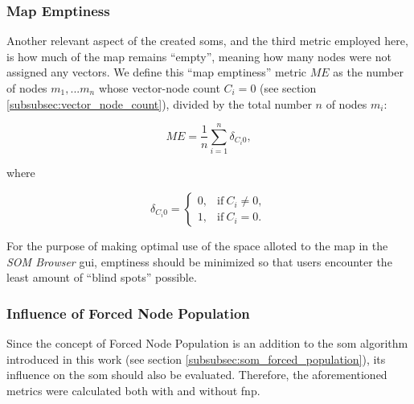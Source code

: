 \subsubsection{Map Emptiness}
\label{subsubsec:map_emptiness}
Another relevant aspect of the created \glspl{som}, and the third metric
employed here, is how much of the map remains ``empty'', meaning how many nodes
were not assigned any vectors. We define this ``map emptiness'' metric $ ME $ as
the number of nodes $ m_1, ... m_n $ whose vector-node count $ C_i = 0 $ (see
section \ref{subsubsec:vector_node_count}), divided by the total number $n$ of
nodes $ m_i $:

\begin{equation}
  ME = \frac{1}{n}\sum\limits_{i=1}^{n}{\delta_{C_i 0}},
\end{equation}

where

\begin{equation}
  \delta_{C_i 0} =
  \begin{cases}
    0, & \text{if}\ C_i \neq 0, \\
    1, & \text{if}\ C_i = 0.
  \end{cases}
\end{equation}

For the purpose of making optimal use of the space alloted to the map in the
\textit{SOM Browser} \gls{gui}, emptiness should be minimized so that users
encounter the least amount of ``blind spots'' possible.

\subsubsection{Influence of Forced Node Population}
\label{subsubsec:eval_fnp_influence}
Since the concept of Forced Node Population is an addition to the \gls{som}
algorithm introduced in this work (see section
\ref{subsubsec:som_forced_population}), its influence on the \gls{som} should
also be evaluated. Therefore, the aforementioned metrics were calculated
both with and without \gls{fnp}.


